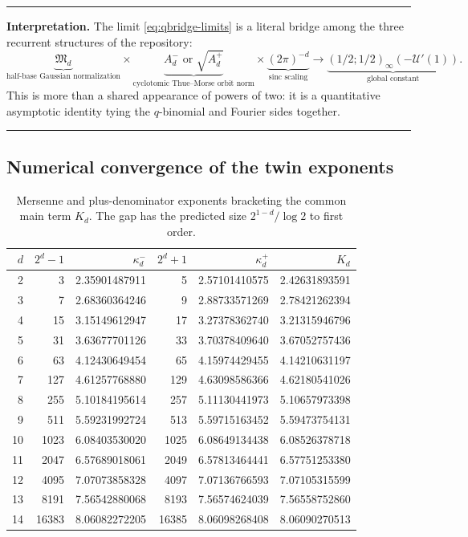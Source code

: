 \documentclass[11pt,oneside]{article}
\theoremstyle{definition}
\theoremstyle{remark}
\newenvironment{boxedremark}{\par\smallskip\noindent\begin{center}\begin{minipage}{0.94\textwidth}\hrule\vspace{0.6em}\small}{\vspace{0.6em}\hrule\end{minipage}\end{center}\smallskip}
\begin{document}
\begin{boxedremark}
\textbf{Interpretation.} The limit \eqref{eq:qbridge-limits} is a literal bridge
among the three recurrent structures of the repository:
\[
 \underbrace{\mathfrak M_d}_{\text{half-base Gaussian normalization}}
 \times
 \underbrace{A_d^-\text{ or }\sqrt{A_d^+}}_{\text{cyclotomic Thue--Morse orbit norm}}
 \times
 \underbrace{(2\pi)^{-d}}_{\text{sinc scaling}}
 \longrightarrow
 \underbrace{(1/2;1/2)_\infty(-\mathscr U'(1))}_{\text{global constant}}.
\]
This is more than a shared appearance of powers of two: it is a quantitative
asymptotic identity tying the $q$-binomial and Fourier sides together.
\end{boxedremark}

\subsection{Numerical convergence of the twin exponents}

\begin{table}[ht]
\centering\small
\begin{tabular}{rrrrrr}
\toprule
$d$ & $2^d-1$ & $\kappa_d^-$ & $2^d+1$ & $\kappa_d^+$ & $K_d$ \\
\midrule
2  & 3     & 2.35901487911 & 5     & 2.57101410575 & 2.42631893591 \\
3  & 7     & 2.68360364246 & 9     & 2.88733571269 & 2.78421262394 \\
4  & 15    & 3.15149612947 & 17    & 3.27378362740 & 3.21315946796 \\
5  & 31    & 3.63677701126 & 33    & 3.70378409640 & 3.67052757436 \\
6  & 63    & 4.12430649454 & 65    & 4.15974429455 & 4.14210631197 \\
7  & 127   & 4.61257768880 & 129   & 4.63098586366 & 4.62180541026 \\
8  & 255   & 5.10184195614 & 257   & 5.11130441973 & 5.10657973398 \\
9  & 511   & 5.59231992724 & 513   & 5.59715163452 & 5.59473754131 \\
10 & 1023  & 6.08403530020 & 1025  & 6.08649134438 & 6.08526378718 \\
11 & 2047  & 6.57689018061 & 2049  & 6.57813464441 & 6.57751253380 \\
12 & 4095  & 7.07073858328 & 4097  & 7.07136766593 & 7.07105315599 \\
13 & 8191  & 7.56542880068 & 8193  & 7.56574624039 & 7.56558752860 \\
14 & 16383 & 8.06082272205 & 16385 & 8.06098268408 & 8.06090270513 \\
\bottomrule
\end{tabular}
\caption{Mersenne and plus-denominator exponents bracketing the common main term
$K_d$. The gap has the predicted size $2^{1-d}/\log2$ to first order.}
\label{tab:pm-kappa}
\end{table}
\end{document}
